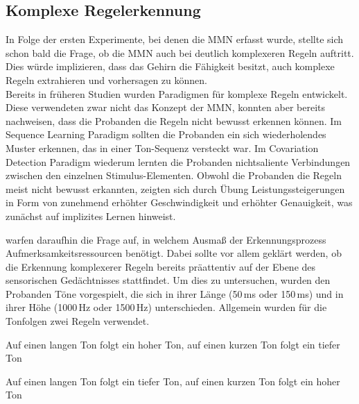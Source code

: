 \documentclass[doc,a4paper,12pt]{apa6}
\begin{document}
\subsection{Komplexe Regelerkennung}

In Folge der ersten Experimente, bei denen die MMN erfasst wurde, stellte sich schon bald die Frage, ob die MMN auch bei deutlich komplexeren Regeln auftritt. Dies würde implizieren, dass das Gehirn die Fähigkeit besitzt, auch komplexe Regeln extrahieren und vorhersagen zu können.\\
Bereits in früheren Studien wurden Paradigmen für komplexe Regeln entwickelt. Diese verwendeten zwar nicht das Konzept der MMN, konnten aber bereits nachweisen, dass die Probanden die Regeln nicht bewusst erkennen können. Im Sequence Learning Paradigm \parencite{hoffmann1998implicit} sollten die Probanden ein sich wiederholendes Muster erkennen, das in einer Ton-Sequenz versteckt war. Im Covariation Detection Paradigm \parencite{stamov2001revealing} wiederum lernten die Probanden nichtsaliente Verbindungen zwischen den einzelnen Stimulus-Elementen. Obwohl die Probanden die Regeln meist nicht bewusst erkannten, zeigten sich durch Übung Leistungssteigerungen in Form von zunehmend erhöhter Geschwindigkeit und erhöhter Genauigkeit, was zunächst auf implizites Lernen hinweist.

\textcite{paavilainen2007preattentive} warfen daraufhin die Frage auf, in welchem Ausmaß der Erkennungsprozess Aufmerksamkeitsressourcen benötigt. Dabei sollte vor allem geklärt werden, ob die Erkennung komplexerer Regeln bereits präattentiv auf der Ebene des sensorischen Gedächtnisses stattfindet. Um dies zu untersuchen, wurden den Probanden Töne vorgespielt, die sich in ihrer Länge (50\,ms oder 150\,ms) und in ihrer Höhe (1000\,Hz oder 1500\,Hz) unterschieden. Allgemein wurden für die Tonfolgen zwei Regeln verwendet.

\begin{compactitem}
  \item Auf einen langen Ton folgt ein hoher Ton, auf einen kurzen Ton folgt ein tiefer
Ton
  \item Auf einen langen Ton folgt ein tiefer Ton, auf einen kurzen Ton folgt ein hoher
Ton
\end{compactitem}
\end{document}
